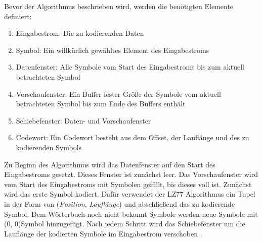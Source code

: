 Bevor der Algorithmus beschrieben wird, werden die benötigten Elemente definiert:

\begin{enumerate}
\item{Eingabestrom:} Die zu kodierenden Daten
\item{Symbol:} Ein willkürlich gewähltes Element des Eingabestroms
\item{Datenfenster:} Alle Symbole vom Start des Eingabestroms bis zum aktuell betrachteten Symbol
\item{Vorschaufenster:} Ein Buffer fester Größe der Symbole vom aktuell betrachteten Symbol bis zum Ende des Buffers enthält
\item{Schiebefenster:} Daten- und Vorschaufenster
\item{Codewort:} Ein Codewort besteht aus dem Offset, der Lauflänge und des zu kodierenden Symbols
\end{enumerate}

Zu Beginn des Algorithmus wird das Datenfenster auf den Start des Eingabestroms gesetzt.
Dieses Fenster ist zunächst leer.
Das Vorschaufenster wird vom Start des Eingabestroms mit Symbolen gefüllt, bis dieses voll ist.
Zunächst wird das erste Symbol kodiert.
Dafür verwendet der LZ77 Algorithmus ein Tupel in der Form von (\textit{Position}, \textit{Lauflänge}) und abschließend das zu kodierende Symbol.
Dem Wörterbuch noch nicht bekannt Symbole werden neue Symbole mit (0, 0)Symbol hinzugefügt.
Nach jedem Schritt wird das Schiebefenster um die Lauflänge der kodierten Symbole im Eingabestrom verschoben
\cite{lz2023}.

